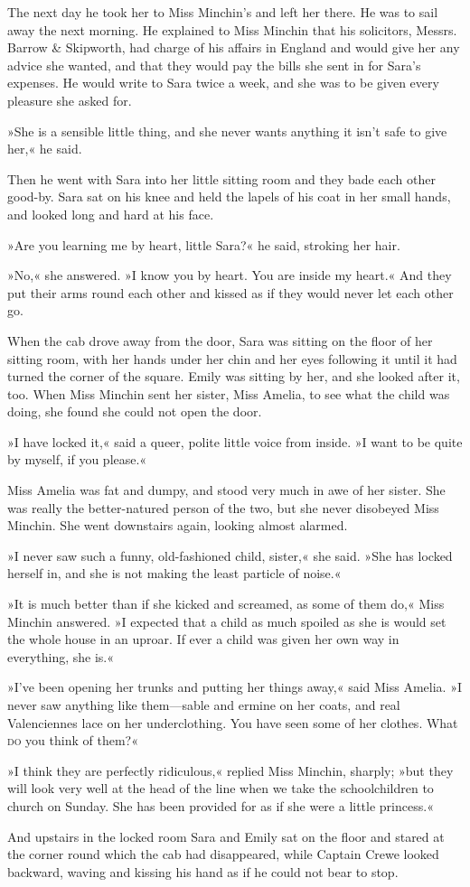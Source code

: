 The next day he took her to Miss Minchin's and left her there. He was to sail away the next morning. He explained to Miss Minchin that his solicitors, Messrs. Barrow \& Skipworth, had charge of his affairs in England and would give her any advice she wanted, and that they would pay the bills she sent in for Sara's expenses. He would write to Sara twice a week, and she was to be given every pleasure she asked for.

»She is a sensible little thing, and she never wants anything it isn't safe to give her,« he said.

Then he went with Sara into her little sitting room and they bade each other good-by. Sara sat on his knee and held the lapels of his coat in her small hands, and looked long and hard at his face.

»Are you learning me by heart, little Sara?« he said, stroking her hair.

»No,« she answered. »I know you by heart. You are inside my heart.« And they put their arms round each other and kissed as if they would never let each other go.

When the cab drove away from the door, Sara was sitting on the floor of her sitting room, with her hands under her chin and her eyes following it until it had turned the corner of the square. Emily was sitting by her, and she looked after it, too. When Miss Minchin sent her sister, Miss Amelia, to see what the child was doing, she found she could not open the door.

»I have locked it,« said a queer, polite little voice from inside. »I want to be quite by myself, if you please.«

Miss Amelia was fat and dumpy, and stood very much in awe of her sister. She was really the better-natured person of the two, but she never disobeyed Miss Minchin. She went downstairs again, looking almost alarmed.

»I never saw such a funny, old-fashioned child, sister,« she said. »She has locked herself in, and she is not making the least particle of noise.«

»It is much better than if she kicked and screamed, as some of them do,« Miss Minchin answered. »I expected that a child as much spoiled as she is would set the whole house in an uproar. If ever a child was given her own way in everything, she is.«

»I've been opening her trunks and putting her things away,« said Miss Amelia. »I never saw anything like them—sable and ermine on her coats, and real Valenciennes lace on her underclothing. You have seen some of her clothes. What \textsc{do} you think of them?«

»I think they are perfectly ridiculous,« replied Miss Minchin, sharply; »but they will look very well at the head of the line when we take the schoolchildren to church on Sunday. She has been provided for as if she were a little princess.«

And upstairs in the locked room Sara and Emily sat on the floor and stared at the corner round which the cab had disappeared, while Captain Crewe looked backward, waving and kissing his hand as if he could not bear to stop.